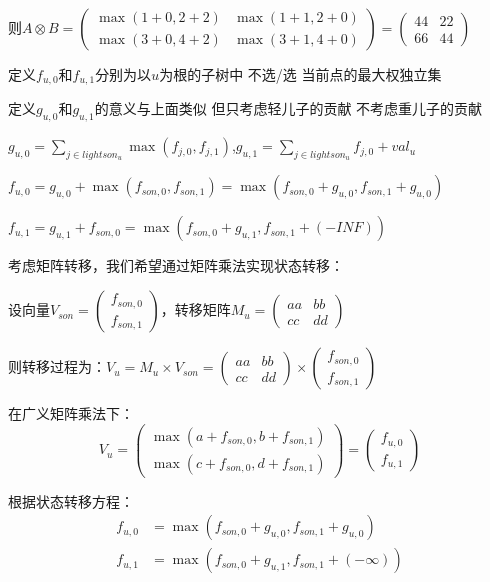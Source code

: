\documentclass[a4paper, fontset=none]{ctexart}
\begin{document}
则$A \otimes B = \begin{pmatrix}\max(1+0, 2+2) & \max(1+1, 2+0) \\ \max(3+0, 4+2) & \max(3+1, 4+0)\end{pmatrix} = \begin{pmatrix}4 4&2 2\\6 6&4 4\end{pmatrix}$

定义$f_{u, 0}$和$f_{u, 1}$分别为以$u$为根的子树中 不选/选 当前点的最大权独立集

定义$g_{u, 0}$和$g_{u, 1}$的意义与上面类似 但只考虑轻儿子的贡献 不考虑重儿子的贡献

$g_{u, 0}=\sum\limits_{j\in lightson_u}\max(f_{j, 0}, f_{j, 1})$,$g_{u, 1}={\sum\limits_{j\in lightson_u}f_{j, 0}}+val_u$

$f_{u, 0}=g_{u, 0}+\max(f_{son, 0}, f_{son, 1})=\max(f_{son, 0}+g_{u, 0}, f_{son, 1}+g_{u, 0})$

$f_{u, 1}=g_{u, 1}+f_{son, 0}=\max(f_{son, 0}+g_{u, 1}, f_{son, 1}+(-INF))$

考虑矩阵转移，我们希望通过矩阵乘法实现状态转移：

设向量$V_{son} = \begin{pmatrix}f_{son, 0} \\ f_{son, 1}\end{pmatrix}$，转移矩阵$M_u = \begin{pmatrix}a a&b b\\c c&d d\end{pmatrix}$

则转移过程为：$V_u = M_u \times V_{son} = \begin{pmatrix}a a&b b\\c c&d d\end{pmatrix} \times \begin{pmatrix}f_{son, 0} \\ f_{son, 1}\end{pmatrix}$

在广义矩阵乘法下：
\[V_u = \begin{pmatrix}\max(a+f_{son, 0}, b+f_{son, 1}) \\ \max(c+f_{son, 0}, d+f_{son, 1})\end{pmatrix} = \begin{pmatrix}f_{u, 0} \\ f_{u, 1}\end{pmatrix}\]

根据状态转移方程：
\begin{align}
f_{u, 0} &= \max(f_{son, 0}+g_{u, 0}, f_{son, 1}+g_{u, 0}) \\
f_{u, 1} &= \max(f_{son, 0}+g_{u, 1}, f_{son, 1}+(-\infty))
\end{align}
\end{document}
